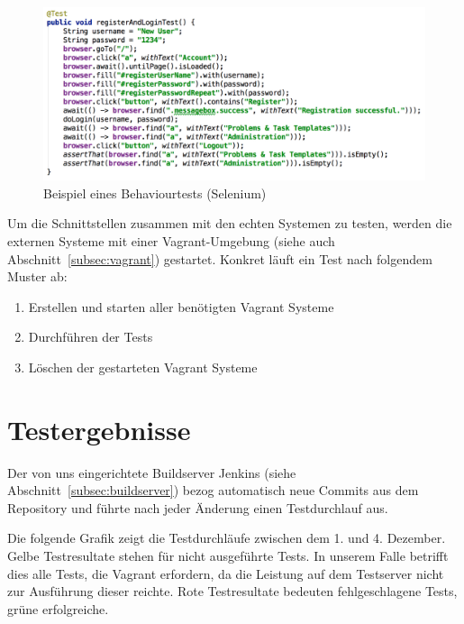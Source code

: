 \begin{description}
					\begin{figure}[H]
						\includegraphics[scale=0.5]{projectPlan/media/img/behaviourTest.png}
						\centering
						\caption{Beispiel eines Behaviourtests (Selenium)}
						\label{fig:exampleBehaviourtest}
					\end{figure}

					Um die Schnittstellen zusammen mit den echten Systemen zu testen,
					werden die externen Systeme mit einer Vagrant-Umgebung (siehe auch Abschnitt~\ref{subsec:vagrant}) gestartet.
					Konkret läuft ein Test nach folgendem Muster ab:
					\begin{enumerate}
						\item Erstellen und starten aller benötigten Vagrant Systeme
						\item Durchführen der Tests
						\item Löschen der gestarteten Vagrant Systeme
					\end{enumerate}


			\end{description}
		
		\section{Testergebnisse}
			Der von uns eingerichtete Buildserver Jenkins (siehe Abschnitt~\ref{subsec:buildserver}) bezog automatisch neue Commits aus dem Repository und führte nach jeder Änderung einen Testdurchlauf aus.
			
			Die folgende Grafik zeigt die Testdurchläufe zwischen dem 1. und 4. Dezember.
			Gelbe Testresultate stehen für nicht ausgeführte Tests.
			In unserem Falle betrifft dies alle Tests, die Vagrant erfordern, da die Leistung auf dem Testserver nicht zur Ausführung dieser reichte.
			Rote Testresultate bedeuten fehlgeschlagene Tests, grüne erfolgreiche.

